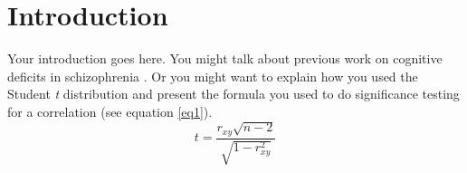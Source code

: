 \section{Introduction}

Your introduction goes here.  You might talk about previous work on cognitive deficits in schizophrenia \citep{brenner2014role}. Or you might want to explain how you used the Student \citet{student1908probable} \textit{t} distribution and present the formula you used to do significance testing for a correlation (see equation \ref{eq1}).
\begin{equation} \label{eq1}
t=\frac{r_{xy} \sqrt{n-2}}{ \sqrt{1-r^{2}_{xy}}}
\end{equation}

\blindtext
